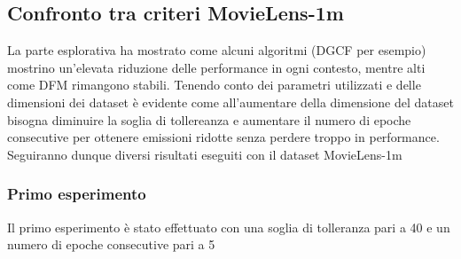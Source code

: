 \subsection{Confronto tra criteri MovieLens-1m}
La parte esplorativa ha mostrato come alcuni algoritmi (DGCF per esempio) mostrino un'elevata riduzione delle performance in ogni contesto, mentre alti come DFM rimangono stabili.
Tenendo conto dei parametri utilizzati e delle dimensioni dei dataset è evidente come all'aumentare della dimensione del dataset bisogna diminuire la soglia di tollereanza e aumentare il numero di epoche consecutive per ottenere emissioni ridotte senza perdere troppo in performance.
Seguiranno dunque diversi risultati eseguiti con il dataset MovieLens-1m

\subsubsection{Primo esperimento}
Il primo esperimento è stato effettuato con una soglia di tolleranza pari a 40 e un numero di epoche consecutive pari a 5

